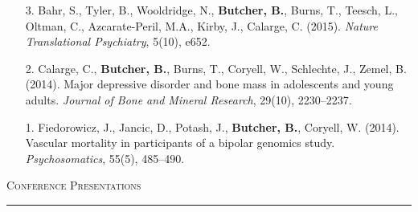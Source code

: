 \documentclass[a4paper]{article}
\begin{document}
\begin{enumerate}
  \item[3.] Bahr, S., Tyler, B., Wooldridge, N., \textbf{Butcher, B.}, Burns, T., Teesch, L.,
    Oltman, C., Azcarate-Peril, M.A., Kirby, J., Calarge, C. (2015).
    \textit{Nature Translational Psychiatry}, 5(10), e652.

  \item[2.] Calarge, C., \textbf{Butcher, B.}, Burns, T., Coryell, W., Schlechte, J., Zemel,
    B. (2014). Major depressive disorder and bone mass in adolescents and young
    adults. \textit{Journal of Bone and Mineral Research}, 29(10), 2230--2237.

  \item[1.] Fiedorowicz, J., Jancic, D., Potash, J., \textbf{Butcher, B.}, Coryell, W.
    (2014). Vascular mortality in participants of a bipolar genomics study.
    \textit{Psychosomatics}, 55(5), 485--490.

\end{enumerate}


\begin{flushleft}
  \Large\textsc{Conference Presentations}
  \textcolor{usafagrey}{\rule[0.5\baselineskip]{\textwidth}{0.75pt}}
\end{flushleft}
\vspace{-1.5\baselineskip}
\end{document}
